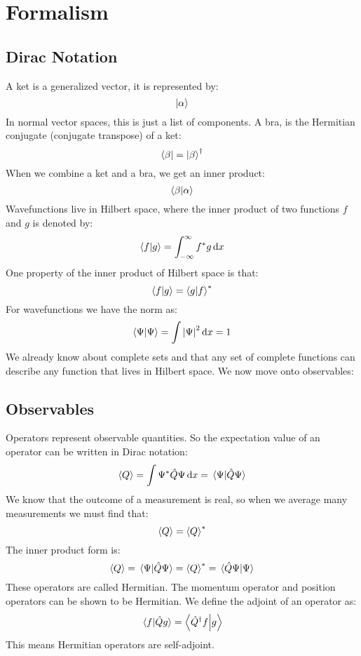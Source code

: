 \section{Formalism}
\subsection{Dirac Notation}
A ket is a generalized vector, it is represented by:
\begin{equation*}
  \ket{\alpha}
\end{equation*}
In normal vector spaces, this is just a list of components. A bra, is the Hermitian conjugate (conjugate transpose) of a ket:
\begin{equation*}
  \bra{\beta}=\ket{\beta}^\dag
\end{equation*}
When we combine a ket and a bra, we get an inner product:
\begin{equation*}
  \braket{\beta}{\alpha}
\end{equation*}
Wavefunctions live in Hilbert space, where the inner product of two functions $f$ and $g$ is denoted by:
\begin{equation*}
  \braket{f}{g}=\int_{-\infty}^{\infty}f^*g\dd{x}
\end{equation*}
One property of the inner product of Hilbert space is that:
\begin{equation*}
  \braket{f}{g}=\braket{g}{f}^*
\end{equation*}
For wavefunctions we have the norm as:
\begin{equation*}
  \braket{\Psi}{\Psi}=\int\abs{\Psi}^2\dd{x}=1
\end{equation*}
We already know about complete sets and that any set of complete functions can describe any function that lives in Hilbert space. We now move onto observables:
\subsection{Observables}
Operators represent observable quantities. So the expectation value of an operator can be written in Dirac notation:
\begin{equation*}
  \ev{Q}=\int\Psi^*\hat{Q}\Psi\dd{x}=\braket*{\Psi}{\hat{Q}\Psi}
\end{equation*}
We know that the outcome of a measurement is real, so when we average many measurements we must find that:
\begin{equation*}
  \ev{Q}=\ev{Q}^*
\end{equation*}
The inner product form is:
\begin{equation*}
  \ev{Q}=\braket*{\Psi}{\hat{Q}\Psi}=\ev{Q}^*=\braket*{\hat{Q}\Psi}{\Psi}
\end{equation*}
These operators are called Hermitian. The momentum operator and position operators can be shown to be Hermitian. We define the adjoint of an operator as:
\begin{equation*}
  \braket*{f}{\hat{Q}g}=\braket{\hat{Q}^\dag f}{g}
\end{equation*}
This means Hermitian operators are self-adjoint.
